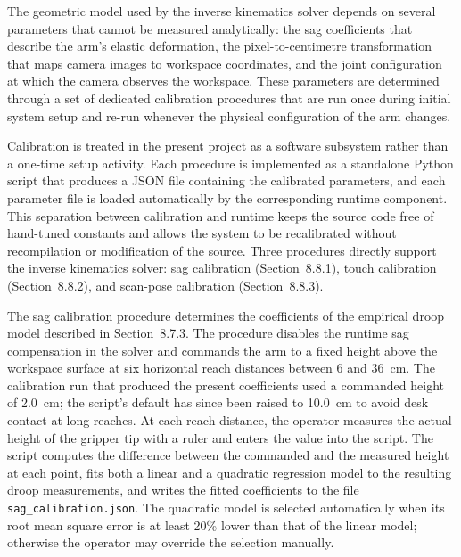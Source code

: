 
The geometric model used by the inverse kinematics solver depends on 
several parameters that cannot be measured analytically: the 
sag coefficients that describe the arm's elastic deformation, the 
pixel-to-centimetre transformation that maps camera images to 
workspace coordinates, and the joint configuration at which the 
camera observes the workspace. These parameters are determined 
through a set of dedicated calibration procedures that are run 
once during initial system setup and re-run whenever the physical 
configuration of the arm changes.

Calibration is treated in the present project as a software 
subsystem rather than a one-time setup activity. Each procedure 
is implemented as a standalone Python script that produces a JSON 
file containing the calibrated parameters, and each parameter file 
is loaded automatically by the corresponding runtime component. 
This separation between calibration and runtime keeps the source 
code free of hand-tuned constants and allows the system to be 
recalibrated without recompilation or modification of the source. 
Three procedures directly support the inverse kinematics solver: 
sag calibration (Section~8.8.1), touch calibration 
(Section~8.8.2), and scan-pose calibration (Section~8.8.3).


The sag calibration procedure determines the coefficients of the 
empirical droop model described in Section~8.7.3. The procedure 
disables the runtime sag compensation in the solver and commands 
the arm to a fixed height above the workspace surface at six 
horizontal reach distances between 6 and 36~cm. The calibration 
run that produced the present coefficients used a commanded 
height of 2.0~cm; the script's default has since been raised to 
10.0~cm to avoid desk contact at long reaches. At each reach 
distance, the operator measures the actual height of the gripper 
tip with a ruler and enters the value into the script. The 
script computes the difference between the commanded and the 
measured height at each point, fits both a linear and a 
quadratic regression model to the resulting droop measurements, 
and writes the fitted coefficients to the file 
\texttt{sag\_calibration.json}. The quadratic model is selected 
automatically when its root mean square error is at least 20\% 
lower than that of the linear model; otherwise the operator may 
override the selection manually.

